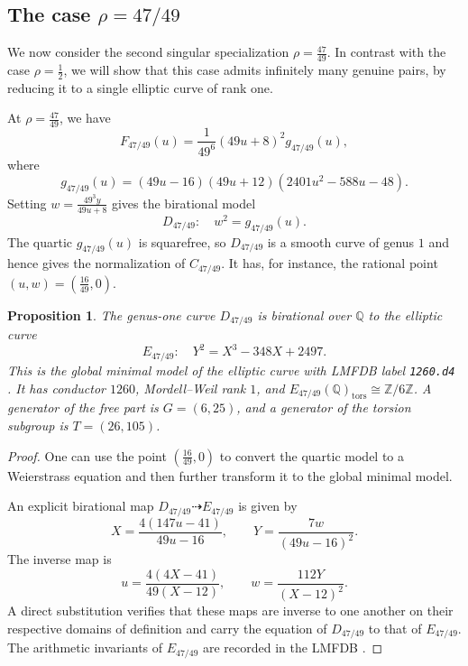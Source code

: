 \documentclass[11pt]{amsart}
\theoremstyle{plain}
\newtheorem{prop}[thm]{Proposition}
\theoremstyle{remark}
\theoremstyle{plain}
\newcommand{\Q}{\mathbb{Q}}
\newcommand{\Z}{\mathbb{Z}}
\begin{document}
\subsection{The case $\rho=47/49$}

We now consider the second singular specialization
$\rho=\frac{47}{49}.$ In contrast with the case $\rho=\frac12$, we will show that this case
admits infinitely many genuine pairs, by reducing it to a single elliptic
curve of rank one.

At $\rho=\frac{47}{49}$, we have
\begin{equation}\label{eq:F4749}
F_{47/49}(u)
=
\frac{1}{49^6}(49u+8)^2g_{47/49}(u),
\end{equation}
where
\[
g_{47/49}(u)
=
(49u-16)(49u+12)(2401u^2-588u-48).
\]
Setting $
w=\frac{49^3y}{49u+8}$
gives the birational model
\begin{equation}\label{eq:D-47}
D_{47/49}\colon\quad
w^2=g_{47/49}(u).
\end{equation}
The quartic $g_{47/49}(u)$ is squarefree, so $D_{47/49}$ is a
smooth curve of genus $1$  and hence gives the normalization of $C_{47/49}$.
It has, for instance, the rational point
$\left(u,w\right)=\left(\frac{16}{49},0\right)$.



\begin{prop}\label{prop:E47}
The genus-one curve $D_{47/49}$ is birational over $\Q$ to the elliptic
curve
\[
E_{47/49}\colon\quad
Y^2=X^3-348X+2497.
\]
This is the global minimal model of the elliptic curve with LMFDB label
\texttt{1260.d4} \cite{lmfdb}. It has conductor $1260$, Mordell--Weil
rank $1$, and
$E_{47/49}(\Q)_{\mathrm{tors}}\cong\Z/6\Z$.
A generator of the free part is $
G=(6,25)$,
and a generator of the torsion subgroup is
$T=(26,105)$.
\end{prop}

\begin{proof}
One can use the point $\left(\frac{16}{49},0\right)$ to convert the
quartic model to a Weierstrass equation and then further transform it
to the global minimal model.

An explicit birational map $D_{47/49}\dashrightarrow E_{47/49}$ is given by
\[
X=\frac{4(147u-41)}{49u-16},
\qquad
Y=\frac{7w}{(49u-16)^2}.
\]
The inverse map is
\[
u=\frac{4(4X-41)}{49(X-12)},
\qquad
w=\frac{112Y}{(X-12)^2}.
\]
A direct substitution verifies that these maps are inverse to one another
on their respective domains of definition and carry the equation of
$D_{47/49}$ to that of $E_{47/49}$. The arithmetic invariants of $E_{47/49}$
are recorded in the LMFDB \cite{lmfdb}.
\end{proof}
\end{document}
